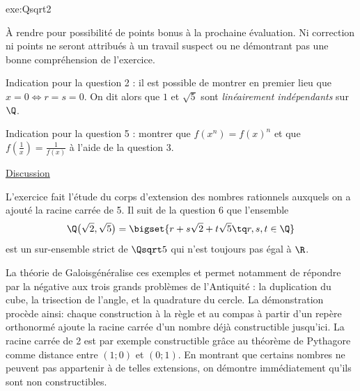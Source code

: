  {exe:Qsqrt2}{
	À rendre pour possibilité de points bonus à la prochaine évaluation.
	Ni correction ni points ne seront attribués à un travail suspect ou ne démontrant pas une bonne compréhension de l'exercice.
	
	Indication pour la question 2 : il est possible de montrer en premier lieu que $x = 0 \iff r=s=0$.
	On dit alors que $1$ et $\sqrt5$ sont \emph{linéairement indépendants} sur $\Q$.
	
	Indication pour la question 5 : montrer que $f(x^n) = f(x)^n$ et que $f\left(\frac1x\right) = \frac1{f(x)}$ à l'aide de la question 3.
	
	\underline{Discussion}
	
	L'exercice fait l'étude du corps d'extension des nombres rationnels auxquels on a ajouté la racine carrée de 5.
	Il suit de la question 6 que l'ensemble 
		\[ \Q\bigl(\sqrt2, \sqrt5\bigr) = \bigset{ r + s \sqrt2 + t\sqrt5 \tq r, s, t \in \Q} \]
	est un sur-ensemble strict de $\Qsqrt5$ qui n'est toujours pas égal à $\R$.
	
	La {théorie de Galois}\footnotemark généralise ces exemples et permet notamment de répondre par la négative aux trois grands problèmes de l'Antiquité : la duplication du cube, la trisection de l'angle, et la quadrature du cercle.
	La démonstration procède ainsi: chaque construction à la règle et au compas à partir d'un repère orthonormé ajoute la racine carrée d'un nombre déjà constructible jusqu'ici.
	La racine carrée de 2 est par exemple constructible grâce au théorème de Pythagore comme distance entre $(1 ; 0)$ et $(0;1)$.
	En montrant que certains nombres ne peuvent pas appartenir à de telles extensions, on démontre immédiatement qu'ils sont non constructibles.
}






